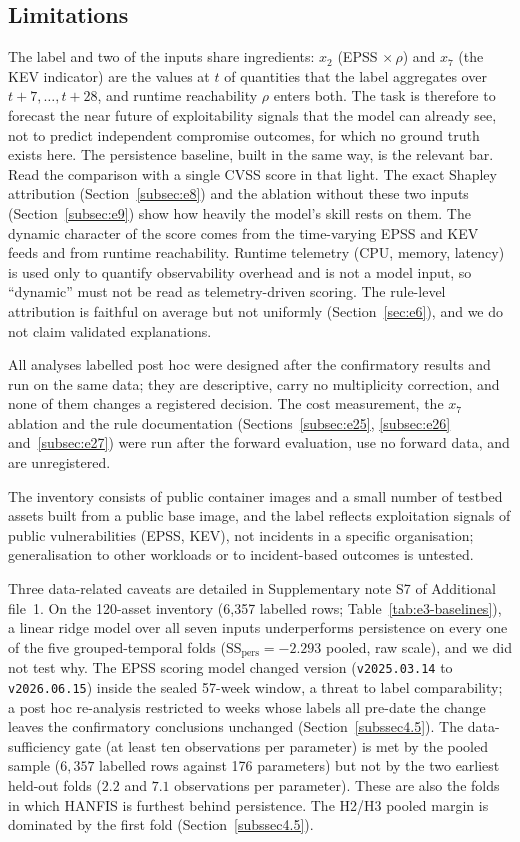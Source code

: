 \documentclass[referee,lineno,pdflatex,sn-basic]{sn-jnl}%
\theoremstyle{thmstyleone}%
\theoremstyle{thmstyletwo}%
\theoremstyle{thmstylethree}%
\begin{document}
\subsection{Limitations}
The label and two of the inputs share ingredients: $x_2$ (EPSS $\times\,\rho$) and $x_7$ (the KEV indicator) are the values at $t$ of quantities that the label aggregates over $t{+}7,\dots,t{+}28$, and runtime reachability $\rho$ enters both. The task is therefore to forecast the near future of exploitability signals that the model can already see, not to predict independent compromise outcomes, for which no ground truth exists here. The persistence baseline, built in the same way, is the relevant bar. Read the comparison with a single CVSS score in that light. The exact Shapley attribution (Section~\ref{subsec:e8}) and the ablation without these two inputs (Section~\ref{subsec:e9}) show how heavily the model's skill rests on them. The dynamic character of the score comes from the time-varying EPSS and KEV feeds and from runtime reachability. Runtime telemetry (CPU, memory, latency) is used only to quantify observability overhead and is not a model input, so ``dynamic'' must not be read as telemetry-driven scoring. The rule-level attribution is faithful on average but not uniformly (Section~\ref{sec:e6}), and we do not claim validated explanations.

\label{subsec5.1}

All analyses labelled post hoc were designed after the confirmatory results and run on the same data; they are descriptive, carry no multiplicity correction, and none of them changes a registered decision. The cost measurement, the $x_7$ ablation and the rule documentation (Sections~\ref{subsec:e25}, \ref{subsec:e26} and~\ref{subsec:e27}) were run after the forward evaluation, use no forward data, and are unregistered.

The inventory consists of public container images and a small number of testbed assets built from a public base image, and the label reflects exploitation signals of public vulnerabilities (EPSS, KEV), not incidents in a specific organisation; generalisation to other workloads or to incident-based outcomes is untested.

Three data-related caveats are detailed in Supplementary note S7 of Additional file~1. On the 120-asset inventory (6{,}357 labelled rows; Table~\ref{tab:e3-baselines}), a linear ridge model over all seven inputs underperforms persistence on every one of the five grouped-temporal folds ($\mathrm{SS}_{\mathrm{pers}}=-2.293$ pooled, raw scale), and we did not test why. The EPSS scoring model changed version (\texttt{v2025.03.14} to \texttt{v2026.06.15}) inside the sealed 57-week window, a threat to label comparability; a post hoc re-analysis restricted to weeks whose labels all pre-date the change leaves the confirmatory conclusions unchanged (Section~\ref{subssec4.5}). The data-sufficiency gate (at least ten observations per parameter) is met by the pooled sample ($6{,}357$ labelled rows against 176 parameters) but not by the two earliest held-out folds ($2.2$ and $7.1$ observations per parameter). These are also the folds in which HANFIS is furthest behind persistence. The H2/H3 pooled margin is dominated by the first fold (Section~\ref{subssec4.5}).
\end{document}
